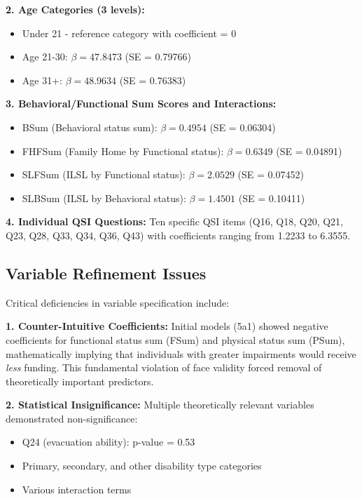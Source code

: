 \textbf{2. Age Categories (3 levels):}
\begin{itemize}
    \item Under 21 - reference category with coefficient = 0
    \item Age 21-30: $\beta = 47.8473$ (SE = 0.79766)
    \item Age 31+: $\beta = 48.9634$ (SE = 0.76383)
\end{itemize}

\textbf{3. Behavioral/Functional Sum Scores and Interactions:}
\begin{itemize}
    \item BSum (Behavioral status sum): $\beta = 0.4954$ (SE = 0.06304)
    \item FHFSum (Family Home by Functional status): $\beta = 0.6349$ (SE = 0.04891)
    \item SLFSum (ILSL by Functional status): $\beta = 2.0529$ (SE = 0.07452)
    \item SLBSum (ILSL by Behavioral status): $\beta = 1.4501$ (SE = 0.10411)
\end{itemize}

\textbf{4. Individual QSI Questions:}
Ten specific QSI items (Q16, Q18, Q20, Q21, Q23, Q28, Q33, Q34, Q36, Q43) with coefficients ranging from 1.2233 to 6.3555.

\subsection{Variable Refinement Issues}

Critical deficiencies in variable specification include:

\textbf{1. Counter-Intuitive Coefficients:}
Initial models (5a1) showed negative coefficients for functional status sum (FSum) and physical status sum (PSum), mathematically implying that individuals with greater impairments would receive \textit{less} funding. This fundamental violation of face validity forced removal of theoretically important predictors.

\textbf{2. Statistical Insignificance:}
Multiple theoretically relevant variables demonstrated non-significance:
\begin{itemize}
    \item Q24 (evacuation ability): p-value = 0.53
    \item Primary, secondary, and other disability type categories
    \item Various interaction terms
\end{itemize}

